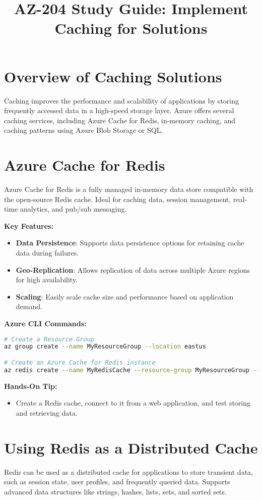 \documentclass{article}
\title{AZ-204 Study Guide: Implement Caching for Solutions}
\author{}
\date{}
\begin{document}
\maketitle

\section{Overview of Caching Solutions}
Caching improves the performance and scalability of applications by storing frequently accessed data in a high-speed storage layer. Azure offers several caching services, including Azure Cache for Redis, in-memory caching, and caching patterns using Azure Blob Storage or SQL.

\section{Azure Cache for Redis}
Azure Cache for Redis is a fully managed in-memory data store compatible with the open-source Redis cache. Ideal for caching data, session management, real-time analytics, and pub/sub messaging.

\textbf{Key Features:}
\begin{itemize}
    \item \textbf{Data Persistence}: Supports data persistence options for retaining cache data during failures.
    \item \textbf{Geo-Replication}: Allows replication of data across multiple Azure regions for high availability.
    \item \textbf{Scaling}: Easily scale cache size and performance based on application demand.
\end{itemize}

\textbf{Azure CLI Commands:}
\begin{lstlisting}[language=bash]
# Create a Resource Group
az group create --name MyResourceGroup --location eastus

# Create an Azure Cache for Redis instance
az redis create --name MyRedisCache --resource-group MyResourceGroup --location eastus --sku Standard --vm-size c1
\end{lstlisting}

\textbf{Hands-On Tip:}
\begin{itemize}
    \item Create a Redis cache, connect to it from a web application, and test storing and retrieving data.
\end{itemize}

\section{Using Redis as a Distributed Cache}
Redis can be used as a distributed cache for applications to store transient data, such as session state, user profiles, and frequently queried data. Supports advanced data structures like strings, hashes, lists, sets, and sorted sets.
\end{document}
